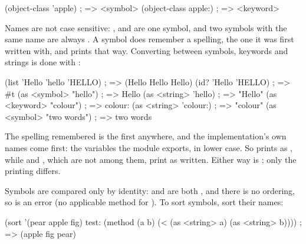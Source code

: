 \begin{dylan}
(object-class 'apple)     ; => <symbol>
(object-class apple:)     ; => <keyword>
\end{dylan}

Names are not case sensitive: ,  and  are
one symbol, and two symbols with the same name are always .
A symbol does remember a spelling, the one it was first written with,
and prints that way. Converting between symbols, keywords and strings is
done with :

\begin{dylan}
(list 'Hello 'hello 'HELLO)           ; => (Hello Hello Hello)
(id? 'Hello 'HELLO)                   ; => #t
(as <symbol> "hello")                 ; => Hello
(as <string> 'hello)                  ; => "Hello"
(as <keyword> "colour")               ; => colour:
(as <string> 'colour:)                ; => "colour"
(as <symbol> "two words")             ; => two words
\end{dylan}

\noindent The spelling remembered is the first anywhere, and the
implementation's own names come first: the variables the 
module exports, in lower case. So  prints as ,
while  and , which are not among them, print as
written. Either way  is ; only the
printing differs.

Symbols are compared only by identity:  and
 are both , and there is no ordering, so
 is an error (no applicable method for
). To sort symbols, sort their names:

\begin{dylan}
(sort '(pear apple fig)
      test: (method (a b) (< (as <string> a) (as <string> b))))
; => (apple fig pear)
\end{dylan}
